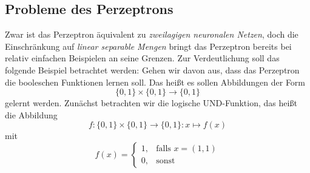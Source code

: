 \documentclass[fontsize=11pt]{scrartcl}
\begin{document}
            \subsection{Probleme des Perzeptrons}
                        Zwar ist das Perzeptron äquivalent zu \emph{zweilagigen neuronalen Netzen}\cite{ertel2016}, doch die Einschränkung auf \emph{linear separable Mengen} bringt das Perzeptron bereits bei relativ einfachen Beispielen an seine Grenzen.
                    Zur Verdeutlichung soll das folgende Beispiel betrachtet werden:
                    \newline
                    Gehen wir davon aus, dass das Perzeptron die booleschen Funktionen lernen soll. Das heißt es sollen Abbildungen der Form $$\{0,1\}\times\{0,1\} \rightarrow \{0,1\}$$ gelernt werden.
                    Zunächst betrachten wir die logische UND-Funktion, das heißt die Abbildung
                    $$
                        f:\{0,1\}\times\{0,1\}\rightarrow\{0,1\}: x\mapsto f(x)
                    $$
                    mit
                    $$
                        f(x)=\left\{\begin{array}{cl} 1, & \mbox{falls }x=(1,1)\\
                        0, & \mbox{sonst}\end{array}\right. 
                    $$
\end{document}
